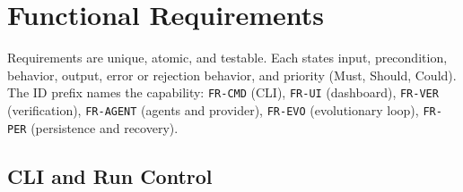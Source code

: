 \documentclass[12pt,a4paper]{article}
\begin{document}
\section{Functional Requirements}

Requirements are unique, atomic, and testable. Each states input, precondition, behavior, output, error or rejection behavior, and priority (Must, Should, Could). The ID prefix names the capability: \texttt{FR-CMD} (CLI), \texttt{FR-UI} (dashboard), \texttt{FR-VER} (verification), \texttt{FR-AGENT} (agents and provider), \texttt{FR-EVO} (evolutionary loop), \texttt{FR-PER} (persistence and recovery).

\subsection{CLI and Run Control}
\end{document}
